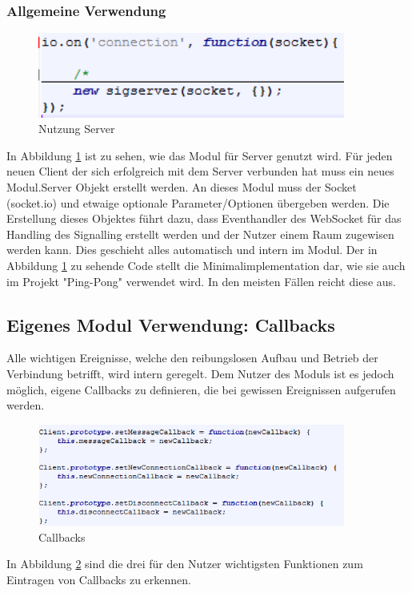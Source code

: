 \subsubsection{Allgemeine Verwendung} \label{serveruse}
\begin{figure}[htH]
\centering
\includegraphics[width=0.9\textwidth]{backend/Modul_UserServerHowTo.PNG}
\caption{Nutzung Server}
\label{backfig8}
\end{figure}
In Abbildung \ref{backfig8} ist zu sehen, wie das Modul für Server genutzt wird. Für jeden neuen Client der sich erfolgreich mit dem Server verbunden hat muss ein neues Modul.Server Objekt erstellt werden. An dieses Modul muss der Socket (socket.io) und etwaige optionale Parameter/Optionen übergeben werden. Die Erstellung dieses Objektes führt dazu, dass Eventhandler des WebSocket für das Handling des Signalling erstellt werden und der Nutzer einem Raum zugewisen werden kann. Dies geschieht alles automatisch und intern im Modul. Der in Abbildung \ref{backfig8} zu sehende Code stellt die Minimalimplementation dar, wie sie auch im Projekt "Ping-Pong" verwendet wird. In den meisten Fällen reicht diese aus.



\subsection{Eigenes Modul Verwendung: Callbacks}
Alle wichtigen Ereignisse, welche den reibungslosen Aufbau und Betrieb der Verbindung betrifft, wird intern geregelt. Dem Nutzer des Moduls ist es jedoch möglich, eigene Callbacks zu definieren, die bei gewissen Ereignissen aufgerufen werden.
\begin{figure}[htH]
\centering
\includegraphics[width=0.9\textwidth]{backend/Modul_Callbacks.PNG}
\caption{Callbacks}
\label{backfig9}
\end{figure}
In Abbildung \ref{backfig9} sind die drei für den Nutzer wichtigsten Funktionen zum Eintragen von Callbacks zu erkennen.

